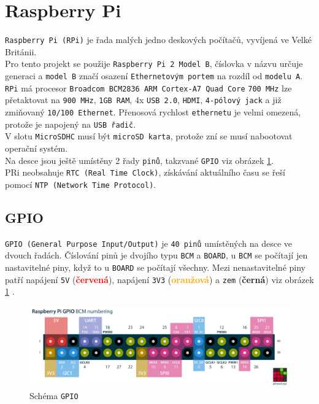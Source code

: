 \documentclass[czech,BP]{thesiskiv}
\begin{document}
	\section{Raspberry Pi}
		\texttt{Raspberry Pi (RPi)} je řada malých jedno deskových počítačů, vyvíjená ve Velké Británii.\\		
		Pro tento projekt se použije \texttt{Raspberry Pi 2 Model B}, číslovka v názvu určuje generaci a \texttt{model B} značí osazení \texttt{Ethernetovým portem} na rozdíl od \texttt{modelu A}.
		\texttt{RPi} má procesor \texttt{Broadcom BCM2836 ARM Cortex-A7 Quad Core} \texttt{700 MHz} lze přetaktovat na \texttt{900 MHz}, \texttt{1GB RAM}, 4x \texttt{USB 2.0}, \texttt{HDMI}, \texttt{4-pólový jack} a již zmiňovaný \texttt{10/100 Ethernet}. Přenosová rychlost \texttt{ethernetu} je velmi omezená, protože je napojený na \texttt{USB řadič}.\\
		V slotu \texttt{MicroSDHC} musí být \texttt{microSD karta}, protože zní se musí nabootovat operační systém.\\
		Na desce jsou ještě umístěny 2 řady \texttt{pinů}, takzvané \texttt{GPIO} viz obrázek \ref{fig:gpio}.\\
		PRi neobsahuje \texttt{RTC (Real Time Clock)}, získávání aktuálního času se řeší pomocí \texttt{NTP (Network Time Protocol)}.
	

		\subsection{GPIO}
			\texttt{GPIO (General Purpose Input/Output)} je \texttt{40 pinů} umístěných na desce ve dvouch řadách. Číslování pinů je dvojího typu \texttt{BCM} a \texttt{BOARD}, u \texttt{BCM} se počítají jen nastavitelné piny, když to u \texttt{BOARD} se počítají všechny.
Mezi nenastavitelné piny patří napájení \texttt{5V} (\textcolor{red}{\textbf{červená}}), napájení \texttt{3V3} (\textcolor{orange}{\textbf{oranžová}}) a \texttt{zem} (\textbf{černá}) viz obrázek \ref{fig:gpio} .	
		
		\begin{figure}[h]
   		 	\centering
			\includegraphics[width=1\textwidth]{../images/gpio.png}	
			\caption{Schéma \texttt{GPIO}}
    		\label{fig:gpio}
		\end{figure}		
		
\end{document}

